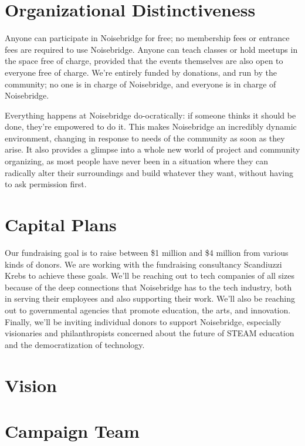 \documentclass[12pt]{article}
\begin{document}
\section{Organizational Distinctiveness}

Anyone can participate in Noisebridge for free; no membership fees or entrance fees are required to use Noisebridge. Anyone can teach classes or hold meetups in the space free of charge, provided that the events themselves are also open to everyone free of charge. We're entirely funded by donations, and run by the community; no one is in charge of Noisebridge, and everyone is in charge of Noisebridge.

Everything happens at Noisebridge do-ocratically: if someone thinks it should be done, they're empowered to do it. This makes Noisebridge an incredibly dynamic environment, changing in response to needs of the community as soon as they arise. It also provides a glimpse into a whole new world of project and community organizing, as most people have never been in a situation where they can radically alter their surroundings and build whatever they want, without having to ask permission first.

\section{Capital Plans}

Our fundraising goal is to raise between \$1 million and \$4 million from various kinds of donors. We are working with the fundraising consultancy Scandiuzzi Krebs to achieve these goals. We'll be reaching out to tech companies of all sizes because of the deep connections that Noisebridge has to the tech industry, both in serving their employees and also supporting their work. We'll also be reaching out to governmental agencies that promote education, the arts, and innovation. Finally, we'll be inviting individual donors to support Noisebridge, especially visionaries and philanthropists concerned about the future of STEAM education and the democratization of technology.

\section{Vision}

\section{Campaign Team}
\end{document}
